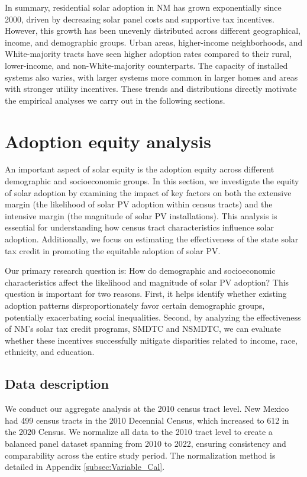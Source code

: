 \documentclass[11pt,twoside,letterpaper]{article}
\begin{document}
In summary, residential solar adoption in NM has grown exponentially since 2000, driven by decreasing solar panel costs and supportive tax incentives. However, this growth has been unevenly distributed across different geographical, income, and demographic groups. Urban areas, higher-income neighborhoods, and White-majority tracts have seen higher adoption rates compared to their rural, lower-income, and non-White-majority counterparts. The capacity of installed systems also varies, with larger systems more common in larger homes and areas with stronger utility incentives. These trends and distributions directly motivate the empirical analyses we carry out in the following sections.


\section{Adoption equity analysis}
\label{sec:adoption_equity}

An important aspect of solar equity is the adoption equity across different demographic and socioeconomic groups. In this section, we investigate the equity of solar adoption by examining the impact of key factors on both the extensive margin (the likelihood of solar PV adoption within census tracts) and the intensive margin (the magnitude of solar PV installations). This analysis is essential for understanding how census tract characteristics influence solar adoption. Additionally, we focus on estimating the effectiveness of the state solar tax credit in promoting the equitable adoption of solar PV.

Our primary research question is: How do demographic and socioeconomic characteristics affect the likelihood and magnitude of solar PV adoption? This question is important for two reasons. First, it helps identify whether existing adoption patterns disproportionately favor certain demographic groups, potentially exacerbating social inequalities. Second, by analyzing the effectiveness of NM's solar tax credit programs, SMDTC and NSMDTC, we can evaluate whether these incentives successfully mitigate disparities related to income, race, ethnicity, and education. 

\subsection{Data description}

We conduct our aggregate analysis at the 2010 census tract level. New Mexico had 499 census tracts in the 2010 Decennial Census, which increased to 612 in the 2020 Census. We normalize all data to the 2010 tract level to create a balanced panel dataset spanning from 2010 to 2022, ensuring consistency and comparability across the entire study period. The normalization method is detailed in Appendix \ref{subsec:Variable_Cal}.
\end{document}
